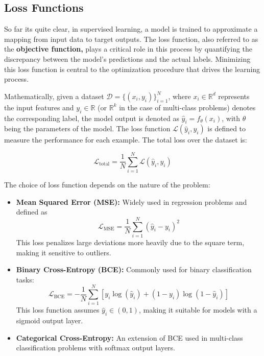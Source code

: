 \subsection{Loss Functions}

So far its quite clear, in supervised learning, a model is trained to approximate a mapping from input data to target outputs. The loss function, also referred to as the \textbf{objective function,} plays a critical role in this process by quantifying the discrepancy between the model's predictions and the actual labels. Minimizing this loss function is central to the optimization procedure that drives the learning process.

Mathematically, given a dataset \( \mathcal{D} = \{(x_i, y_i)\}_{i=1}^N \), where \( x_i \in \mathbb{R}^d \) represents the input features and \( y_i \in \mathbb{R} \) (or \( \mathbb{R}^k \) in the case of multi-class problems) denotes the corresponding label, the model output is denoted as \( \hat{y}_i = f_\theta(x_i) \), with \( \theta \) being the parameters of the model. The loss function \( \mathcal{L}(\hat{y}_i, y_i) \) is defined to measure the performance for each example. The total loss over the dataset is:

\[
\mathcal{L}_{\text{total}} = \frac{1}{N} \sum_{i=1}^N \mathcal{L}(\hat{y}_i, y_i)
\]

The choice of loss function depends on the nature of the problem:

\begin{itemize}
    \item \textbf{Mean Squared Error (MSE):} Widely used in regression problems and defined as
    \begin{equation}
        \mathcal{L}_{\text{MSE}} = \frac{1}{N} \sum_{i=1}^N (\hat{y}_i - y_i)^2
        \label{eq:mse_loss}
    \end{equation}
    This loss penalizes large deviations more heavily due to the square term, making it sensitive to outliers.

    \item \textbf{Binary Cross-Entropy (BCE):} Commonly used for binary classification tasks:
    \begin{equation}
        \mathcal{L}_{\text{BCE}} = -\frac{1}{N} \sum_{i=1}^N \left[ y_i \log(\hat{y}_i) + (1 - y_i) \log(1 - \hat{y}_i) \right]
        \label{eq:bce_loss}
    \end{equation}
    This loss function assumes \( \hat{y}_i \in (0, 1) \), making it suitable for models with a sigmoid output layer.

    \item \textbf{Categorical Cross-Entropy:} An extension of BCE used in multi-class classification problems with softmax output layers.
\end{itemize}

